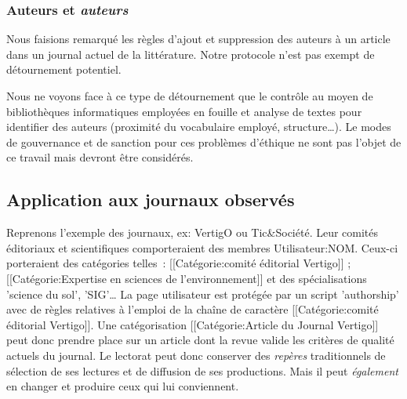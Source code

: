\subsubsection{Auteurs et \textit{auteurs}}

Nous faisions remarqué les règles d'ajout et suppression des auteurs à un article dans un journal actuel de la littérature.
Notre protocole n'est pas exempt de détournement potentiel.

Nous ne voyons face à ce type de détournement que le contrôle au moyen de bibliothèques informatiques employées en fouille et analyse de textes pour identifier des auteurs (proximité du vocabulaire employé, structure\ldots).
Le modes de gouvernance et de sanction pour ces problèmes d'éthique ne sont pas l'objet de ce travail mais devront être considérés.

\subsection{Application aux journaux observés}
Reprenons l'exemple des journaux, ex: VertigO ou Tic\&Société.
Leur comités éditoriaux et scientifiques comporteraient des membres Utilisateur:NOM.
Ceux-ci porteraient des catégories telles~: [[Catégorie:comité éditorial Vertigo]] ; [[Catégorie:Expertise en sciences de l'environnement]] et des spécialisations 'science du sol', '\gls{SIG}'\ldots
La page utilisateur est protégée par un script 'authorship' avec de règles relatives à l'emploi de la chaîne de caractère [[Catégorie:comité éditorial Vertigo]].
Une catégorisation [[Catégorie:Article du Journal Vertigo]] peut donc prendre place sur un article dont la revue valide les critères de qualité actuels du journal.
Le lectorat peut donc conserver des \emph{repères} traditionnels de sélection de ses lectures et de diffusion de ses productions.
Mais il peut \emph{également} en changer et produire ceux qui lui conviennent.

